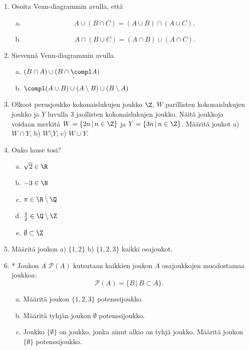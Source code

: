 \begin{enumerate}
\item Osoita Venn-diagrammin avulla, että
\begin{enumerate}[a)]
\item 
\[
A\cup (B \cap C) = (A\cup B)\cap(A\cup C),
\]
\item 
\[
A\cap (B \cup C) = (A\cap B)\cup(A\cap C).
\]
\end{enumerate}

\item Sievennä Venn-diagrammin avulla.
\begin{enumerate}[a)]
\item $(B\cap A) \cup (B \cap \compl A)$
\item $\compl (A\cup B) \cup (A \setminus B) \cup (B \setminus A)$
\end{enumerate}

\item
Olkoot perusjoukko kokonaislukujen joukko $\Z$, $W$ parillisten kokonaislukujen joukko ja $Y$ luvulla $3$ jaollisten kokonaislukujen joukko. Näitä joukkoja voidaan merkitä $W = \{2n\,|\, n\in\Z\}$ ja $Y = \{3n \,|\, n \in \Z\}$. Määritä joukot a) $W \cap Y$, b) $W \setminus Y$, c) $W \cup Y$.

\item Onko lause tosi?
\begin{enumerate}[a)]
\item $\sqrt{2} \in \R$
\item $-3 \in \N$
\item $\pi \in \R \setminus \Q$
\item $\frac{4}{2} \in \Q \setminus \Z$
\item $\emptyset \subset \Z$
\end{enumerate}

\item Määritä joukon a) $\{1, 2\}$ b) $\{1, 2, 3\}$ kaikki osajoukot.

\item * %
Joukon $A$  $\mathcal{P}(A)$ kutsutaan kaikkien joukon $A$ osajoukkojen muodostamaa joukkoa:
\[
\mathcal{P}(A)=\{ B \, | \, B\subset A\}.
\]
\begin{enumerate}[a)]
\item Määritä joukon $\{1, 2, 3\}$ potenssijoukko.
\item Määritä tyhjän joukon $\emptyset$ potenssijoukko.
\item Joukko $\{\emptyset\}$ on joukko, jonka ainut alkio on tyhjä joukko. Määritä joukon $\{\emptyset\}$ potenssijoukko.
\end{enumerate}


\end{enumerate}
